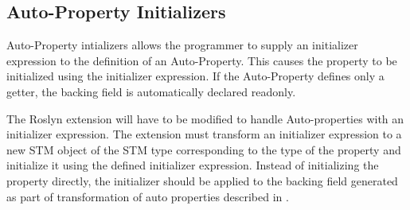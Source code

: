 \subsection{Auto-Property Initializers}
Auto-Property intializers allows the programmer to supply an initializer expression to the definition of an Auto-Property\cite{csharp6one}\cite{csharp6two}\cite{csharp6featureDescription}. This causes the property  to be initialized using the initializer expression. If the Auto-Property defines only a getter, the backing field is automatically declared readonly\cite{csharp6one}\cite{csharp6featureDescription}. 

The Roslyn extension will have to be modified to handle  Auto-properties with an initializer expression. The extension must transform an initializer expression to a new \ac{STM} object of the \ac{STM} type corresponding to the type of the  property and initialize it using the defined initializer expression. Instead of initializing the property directly, the initializer should be applied to the backing field generated as part of transformation of  auto properties described in .

\worksheetend
